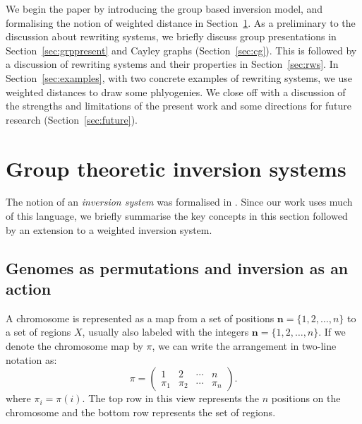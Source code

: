 \documentclass[utf8]{Frontiers_LaTex_Templates/frontiersFPHY} %
\newcommand{\n}{\mathbf n}
\numberwithin{equation}{section}
\begin{document}
We begin the paper by introducing the group based inversion model, and formalising the notion of weighted distance in Section~\ref{subs:invsys}. As a preliminary to the discussion about rewriting systems, we briefly discuss group presentations in Section~\ref{sec:grppresent} and Cayley graphs (Section~\ref{sec:cg}). This is followed by a discussion of rewriting systems and their properties in Section~\ref{sec:rws}. In Section~\ref{sec:examples}, with two concrete examples of rewriting systems, we use weighted distances to draw some phlyogenies. We close off with a discussion of the strengths and limitations of the present work and some directions for future research (Section~\ref{sec:future}).


\section[Inversion systems]{Group theoretic inversion systems}\label{subs:invsys}

The notion of an \emph{inversion system} was formalised in \citet{egrinagy2013group}. Since our work uses much of this language, we briefly summarise the key concepts in this section followed by an extension to a weighted inversion system.  

\medskip
\subsection*{Genomes as permutations and inversion as an action}

A chromosome is represented as a map from a set of positions $\n=\{ 1,2,\dots,n\}$ to a set of regions $X$, usually also labeled with the integers $\n=\{1,2,\dots,n\}$. If we denote the chromosome map by $\pi$, we can write the arrangement in two-line notation as:
\[
\pi=\begin{pmatrix}
1 & 2 & \cdots & n\\
\pi_1 & \pi_2 & \cdots & \pi_n
\end{pmatrix}.
\]
where $\pi_i = \pi(i)$. The top row in this view represents the $n$ positions on the chromosome and the bottom row represents the set of regions.  
\end{document}

